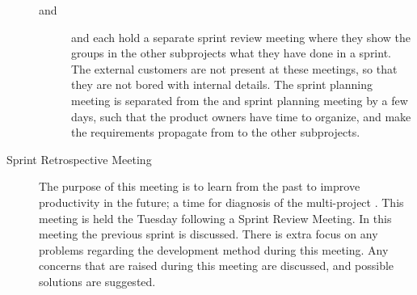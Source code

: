 \begin{description}
\begin{description}
    \item[\db and \bd] \db and \bd each hold a separate sprint review meeting where they show the groups in the other subprojects what they have done in a sprint. The external customers are not present at these meetings, so that they are not bored with internal details. The \gui sprint planning meeting is separated from the \db and \bd sprint planning meeting by a few days, such that the product owners have time to organize, and make the requirements propagate from \gui to the other subprojects.
  \end{description}
  \item[Sprint Retrospective Meeting]  The purpose of this meeting is to learn from the past to improve productivity in the future; a time for diagnosis of the multi-project \cite{scrumChecklist}. This meeting is held the Tuesday following a Sprint Review Meeting. In this meeting the previous sprint is discussed. There is extra focus on any problems regarding the development method during this meeting. Any concerns that are raised during this meeting are discussed, and possible solutions are suggested.
\end{description}

